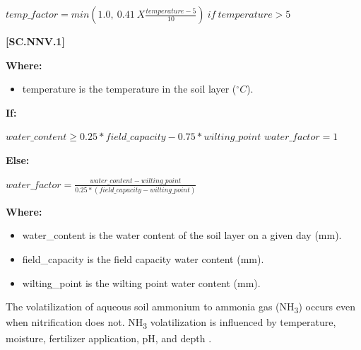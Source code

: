     \begin{center}
 \(temp\_factor=min(1.0,\ 0.41\ X\frac{temperature - 5}{10})\ if\ temperature > 5\)
    \end{center}
        \vspace{0.5cm} 
    
            {\raggedleft \textbf{[SC.NNV.1]}\par}
            \vspace{0.5cm}

        \textbf{Where:}
            
        \begin{itemize}
            \item temperature is the temperature in the soil layer (\(^\circ C\)).
        \end{itemize}
    \vspace{0.5cm}

        \textbf{If:}
            
    \begin{center}
 \(water\_content \geq 0.25 * field\_capacity - 0.75 * wilting\_point\)
    \vspace{0.5cm}
	\(water\_factor = 1\)
    \end{center}
        \vspace{0.5cm} 
        
        \textbf{Else:}
            
    \begin{center}
 \(water\_factor=\frac{water\_content - wilting\_point}{0.25*(field\_capacity - wilting\_point)}	\)
    \end{center}
            \vspace{0.5cm}

        \textbf{Where:}
            
        \begin{itemize}
            \item water\_content is the water content of the soil layer on a given day (mm).
            \item field\_capacity is the field capacity water content (mm).
            \item wilting\_point is the wilting point water content (mm).

        \end{itemize}
    \vspace{0.5cm}

The volatilization of aqueous soil ammonium to ammonia gas (NH\textsubscript{3}) occurs even when nitrification does not. NH\textsubscript{3} volatilization is influenced by temperature, moisture, fertilizer application, pH, and depth \parencite{mu-extsoil}.
\vspace{0.5cm}

